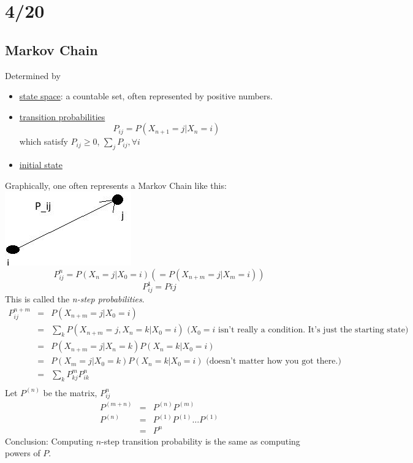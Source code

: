 \section*{4/20}
  \subsection*{Markov Chain}
    Determined by
    \begin{itemize}
      \item \underline{state space}: a countable set, often represented
        by positive numbers.
      \item \underline{transition probabilities}
        $$
          P_{ij} = P(X_{n+1} = j | X_n = i)
        $$
        which satisfy $P_{ij} \ge 0$, $\sum_j P_{ij}, \forall i$
      \item \underline{initial state}
    \end{itemize}
    Graphically, one often represents a Markov Chain like this:\\
    \includegraphics{4_20.jpeg}\\
    $$
      P_{ij}^n = P(X_n = j | X_0 = i) (= P(X_{n+m} = j | X_m = i))
    $$
    $$
      P_{ij}^1 = P{ij}
    $$
    This is called the \emph{n-step probabilities}.\\
    \begin{eqnarray*}
      P_{ij}^{n+m} & = & P(X_{n+m} = j | X_0 = i)\\
        & = & \sum_k P(X_{n+m} = j, X_n = k | X_0 = i) \text{ ($X_0 =i$ isn't really a condition. It's just the starting state)}\\
        & = & P(X_{n+m} = j | X_n= k)P(X_n = k | X_0 = i) \\
        & = & P(X_{m} = j | X_0= k)P(X_n = k | X_0 = i) \text{ (doesn't matter how you got there.)}\\
        & = & \sum_k P_{kj}^m P_{ik}^n \\
    \end{eqnarray*}
    Let $P^{(n)}$ be the matrix, $P_{ij}^n$
    \begin{eqnarray*}
      P^{(m+n)}  & = & P^{(n)}P^{(m)} \\
      P^{(n)} & = & P^{(1)}P^{(1)} \ldots P^{(1)}\\
        & = & P^n
    \end{eqnarray*}
    Conclusion: Computing $n$-step transition probability is the same as
    computing powers of $P$.\\

